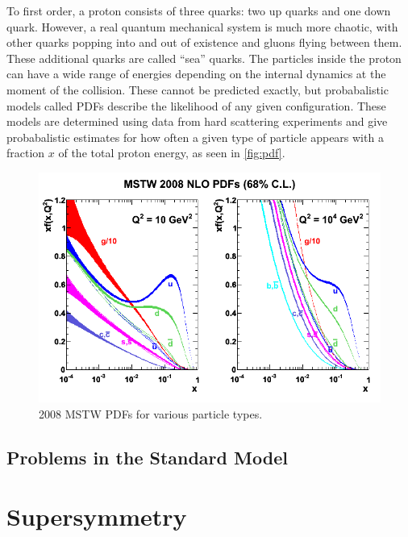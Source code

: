 To first order, a proton consists of three quarks: two up quarks and one down quark. However, a real quantum mechanical system is much more chaotic, with other quarks popping into and out of existence and gluons flying between them. These additional quarks are called ``sea'' quarks. The particles inside the proton can have a wide range of energies depending on the internal dynamics at the moment of the collision. These cannot be predicted exactly, but probabalistic models called \acp{PDF} describe the likelihood of any given configuration. These models are determined using data from hard scattering experiments and give probabalistic estimates for how often a given type of particle appears with a fraction $x$ of the total proton energy, as seen in \autoref{fig:pdf}. 

\begin{centering}
\begin{figure}[bth]
\myfloatalign
\includegraphics[width=.85\linewidth]{figures/theory/mstw2008nlo68cl_allpdfs.png}
\caption{2008 MSTW \acp{PDF} for various particle types. \cite{0901.0002}}
\label{fig:pdf}
\end{figure}
\end{centering}


\subsection{Problems in the Standard Model}
\label{sec:sm_problems}





\section{Supersymmetry}

